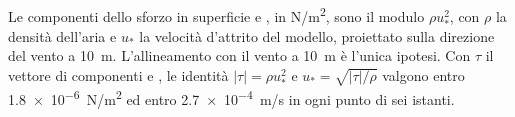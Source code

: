Le componenti dello sforzo in superficie  e , in \si{N/m^2}, sono il modulo
$\rho u_*^2$, con $\rho$ la densità dell'aria e $u_*$ la velocità d'attrito del modello, proiettato
sulla direzione del vento a \SI{10}{m}. L'allineamento con il vento a \SI{10}{m} è l'unica ipotesi.
Con $\tau$ il vettore di componenti  e , le identità $|\tau| = \rho u_*^2$ e
$u_* = \sqrt{|\tau|/\rho}$ valgono entro \SI{1.8e-6}{N/m^2} ed entro \SI{2.7e-4}{m/s} in ogni punto
di sei istanti.
